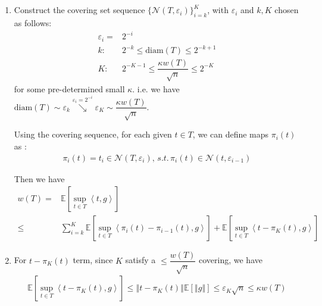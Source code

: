 \documentclass[11pt,a4paper]{ctexart}
\numberwithin{equation}{section}%
\begin{document}
\section{}

\begin{enumerate}[topsep=2pt,itemsep=2pt]
    \item Construct the covering set sequence $ \{\mathcal{N}(T,\varepsilon _i)\}_{i=k}^K $, with $ \varepsilon _i $ and $ k,K $ chosen as follows:
    \begin{align*}
        \varepsilon _i =& 2^{-i}\\
        k: & 2^{-k} \leq{ \mathrm{ diam }(T)  } \leq 2^{-k+1} \\
        K: & 2^{-K-1} \leq \dfrac{ \kappa w(T) }{ \sqrt{n} } \leq 2^{-K}
    \end{align*}
    for some pre-determined small $ \kappa  $. i.e. we have $\mathrm{ diam }(T)\sim  \varepsilon _k \mathop{ \searrow }\limits^{\varepsilon _i = 2^{-i}}  \varepsilon _K\sim  \dfrac{ \kappa w(T) }{ \sqrt{n} } $.
    
    Using the covering sequence, for each given $ t\in T $, we can define maps $ \pi_i(t) $ as :
    \begin{align*}
        \pi_i(t)= t_i\in \mathcal{N}(T,\varepsilon _i),\, s.t.\, \pi_i(t)\in \mathcal{N}(t,\varepsilon _{i-1}) 
    \end{align*}

    Then we have
    \begin{align*}
        w(T)=& \mathbb{E}\left[ \mathop{ \sup  }\limits_{t\in T} \left\langle t,g \right\rangle   \right]  \\
        \leq & \sum_{i=k}^K \mathbb{E}\left[ \mathop{ \sup  }\limits_{t\in T} \left\langle \pi_i(t)-\pi_{i-1}(t),g \right\rangle  \right]  + \mathbb{E}\left[ \mathop{ \sup  }\limits_{t\in T} \left\langle t-\pi_K(t),g \right\rangle   \right] 
    \end{align*}
    
    \item For $ t-\pi_K(t) $ term, since $ K $ satisfy a $ \leq \dfrac{ w(T) }{ \sqrt{n} } $ covering, we have
    \begin{align*}
        \mathbb{E}\left[ \mathop{ \sup }\limits_{t\in T} \left\langle t-\pi_K(t), g \right\rangle   \right] \leq \left\Vert t-\pi_K(t) \right\Vert \mathbb{E}\left[ \left\Vert g  \right\Vert  \right] \leq \varepsilon _K\sqrt{n} \leq \kappa w(T)    
    \end{align*}


\end{enumerate}
\end{document}
